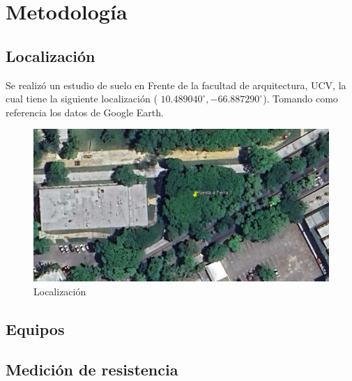 \chapter{Metodología}

\section{Localización}
Se realizó un estudio de suelo en Frente de la facultad de arquitectura, UCV, la cual tiene la siguiente localización ( $10.489040^{\circ}, -66.887290^{\circ}$). Tomando como referencia los datos de Google Earth.

\begin{figure}[H]
    \centering
    \includegraphics[scale=0.6]{Imagenes/localizacion.png}
    \caption{Localización}
    \label{local}
   \end{figure}

\section{Equipos}
\section{Medición de resistencia}